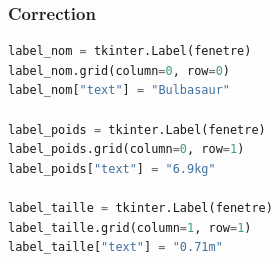 \documentclass[svgnames,11pt]{beamer}
\begin{document}
\begin{frame}[fragile]
    \frametitle{Correction}

    \begin{center}
        \begin{lstlisting}[language=Python , basicstyle=\ttfamily\small, xleftmargin=1em, xrightmargin=1em]
label_nom = tkinter.Label(fenetre)
label_nom.grid(column=0, row=0)
label_nom["text"] = "Bulbasaur"

label_poids = tkinter.Label(fenetre)
label_poids.grid(column=0, row=1)
label_poids["text"] = "6.9kg"

label_taille = tkinter.Label(fenetre)
label_taille.grid(column=1, row=1)
label_taille["text"] = "0.71m"
\end{lstlisting}
        \label{CODE}
    \end{center}

\end{frame}
\end{document}
